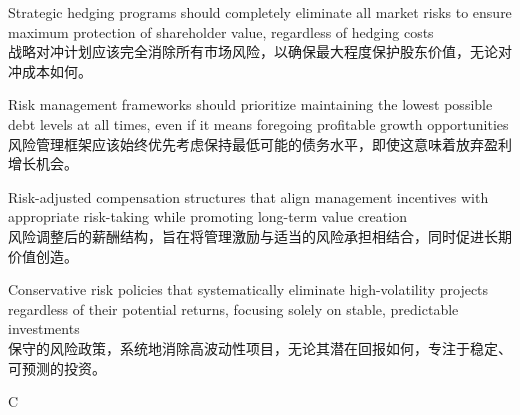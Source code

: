 \documentclass{article}
\begin{document}
\begin{choices}
    \item Strategic hedging programs should completely eliminate all market risks to ensure maximum protection of shareholder value, regardless of hedging costs \\
    战略对冲计划应该完全消除所有市场风险，以确保最大程度保护股东价值，无论对冲成本如何。
    
    \item Risk management frameworks should prioritize maintaining the lowest possible debt levels at all times, even if it means foregoing profitable growth opportunities \\
    风险管理框架应该始终优先考虑保持最低可能的债务水平，即使这意味着放弃盈利增长机会。
    
    \item Risk-adjusted compensation structures that align management incentives with appropriate risk-taking while promoting long-term value creation \\
    风险调整后的薪酬结构，旨在将管理激励与适当的风险承担相结合，同时促进长期价值创造。
    
    \item Conservative risk policies that systematically eliminate high-volatility projects regardless of their potential returns, focusing solely on stable, predictable investments \\
    保守的风险政策，系统地消除高波动性项目，无论其潜在回报如何，专注于稳定、可预测的投资。
\end{choices}

\begin{correctanswer}
    C
\end{correctanswer}
\end{document}
